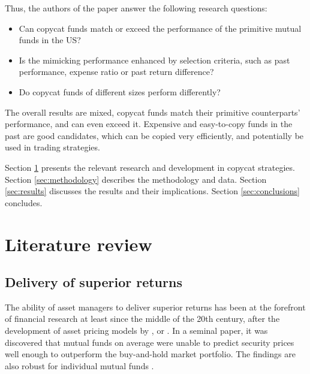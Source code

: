 \documentclass[12pt, a4]{article}
\begin{document}
Thus, the authors of the paper answer the following research questions:

\begin{itemize}
    \item Can copycat funds match or exceed the performance of the primitive mutual funds in the \textsc{US}?
    \item Is the mimicking performance enhanced by selection criteria, such as past performance, expense ratio or past return difference?
    \item Do copycat funds of different sizes perform differently?
\end{itemize}

The overall results are mixed, copycat funds match their primitive counterparts' performance, and can even exceed it. Expensive and easy-to-copy funds in the past are good candidates, which can be copied very efficiently, and potentially be used in trading strategies. 

Section \ref{sec:lit-rev} presents the relevant research and development in copycat strategies. Section \ref{sec:methodology} describes the methodology and data. Section \ref{sec:results} discusses the results and their implications. Section \ref{sec:conclusions} concludes.

\clearpage
\section{Literature review}\label{sec:lit-rev}

\subsection{Delivery of superior returns}

The ability of asset managers to deliver superior returns has been at the forefront of financial research at least since the middle of the 20th century, after the development of asset pricing models by \cite{sharpe}, \cite{litner} or \cite{treynor}. In a seminal paper, it was discovered that mutual funds on average were unable to predict security prices well enough to outperform the buy-and-hold market portfolio. The findings are also robust for individual mutual funds \citep{jensen}.
\end{document}
